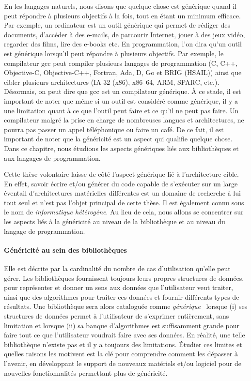 En les langages naturels, nous disons que quelque chose est générique quand il peut répondre à plusieurs objectifs à la
fois, tout en étant un minimum efficace. Par exemple, un ordinateur est un outil générique qui permet de rédiger des
documents, d'accéder à des e-mails, de parcourir Internet, jouer à des jeux vidéo, regarder des films, lire des e-books
etc. En programmation, l'on dira qu'un outil est générique lorsqu'il peut répondre à plusieurs objectifs. Par exemple,
le compilateur gcc peut compiler plusieurs langages de programmation (C, C++, Objective-C, Objective-C++, Fortran, Ada,
D, Go et BRIG (HSAIL)) ainsi que cibler plusieurs architectures (IA-32 (x86), x86--64, ARM, SPARC, etc.). Désormais, on
peut dire que gcc est un compilateur générique. À ce stade, il est important de noter que même si un outil est considéré
comme générique, il y a une limitation quant à ce que l'outil peut faire et ce qu'il ne peut pas faire. Un compilateur
malgré la prise en charge de nombreuses langues et architectures, ne pourra pas passer un appel téléphonique ou faire un
café. De ce fait, il est important de noter que la généricité est un aspect qui qualifie quelque chose. Dans ce
chapitre, nous étudions les aspects génériques liés aux bibliothèques et aux langages de programmation.

Cette thèse volontaire laisse de côté l'aspect générique lié à l'architecture cible. En effet, savoir écrire et/ou
générer du code capable de s'exécuter sur un large éventail d'architectures matérielles différentes est un domaine de
recherche à lui tout seul et n'est pas l'objet principal de cette thèse. Il est également connu sous le nom de
\emph{informatique hétérogène}. Au lieu de cela, nous allons se concentrer sur les aspects liés à la généricité au
niveau de la bibliothèque et au niveau du langage de programmation.

\paragraph{Généricité au sein des bibliothèques} Elle est décrite par la cardinalité du nombre de cas d'utilisation
qu'elle peut gérer. Les bibliothèques fournissent toujours leurs propres structures de données, pour représenter et
donner un sens aux données que l'utilisateur veut traiter, ainsi que des algorithmes pour traiter ces données et fournir
différents types de résultats. Une bibliothèque sera alors cataloguée comme
\emph{générique}~\parencite{musser.1994.algorithm} lorsque (i) ses structures de données permet à l'utilisateur de
s'exprimer entièrement, sans limitation et lorsque (ii) sa banque d'algorithmes est suffisamment grande pour faire tout
ce que l'utilisateur voudrait faire avec ses données. En réalité, une telle bibliothèque n'existe pas et il y a toujours
des limitations. Étudier ces limites et quelles raisons les motivent est la clé pour comprendre comment les dépasser à
l'avenir, en développant le support de nouveaux matériels et/ou logiciel pour de nouvelles fonctionnalités permettant
plus de généricité.

